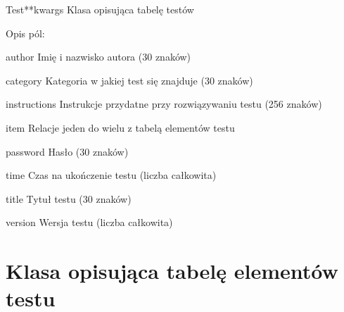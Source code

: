 \documentclass[letterpaper,10pt,polish]{manual}
\begin{document}
\hypertarget{dbmodel.Test}{}\begin{classdesc}{Test}{**kwargs}
Klasa opisująca tabelę testów

Opis pól:

\hypertarget{dbmodel.Test.author}{}\begin{memberdesc}{author}
Imię i nazwisko autora (30 znaków)
\end{memberdesc}

\hypertarget{dbmodel.Test.category}{}\begin{memberdesc}{category}
Kategoria w jakiej test się znajduje (30 znaków)
\end{memberdesc}

\hypertarget{dbmodel.Test.instructions}{}\begin{memberdesc}{instructions}
Instrukcje przydatne przy rozwiązywaniu testu (256 znaków)
\end{memberdesc}

\hypertarget{dbmodel.Test.item}{}\begin{memberdesc}{item}
Relacje jeden do wielu z tabelą elementów testu
\end{memberdesc}

\hypertarget{dbmodel.Test.password}{}\begin{memberdesc}{password}
Hasło (30 znaków)
\end{memberdesc}

\hypertarget{dbmodel.Test.time}{}\begin{memberdesc}{time}
Czas na ukończenie testu (liczba całkowita)
\end{memberdesc}

\hypertarget{dbmodel.Test.title}{}\begin{memberdesc}{title}
Tytuł testu (30 znaków)
\end{memberdesc}

\hypertarget{dbmodel.Test.version}{}\begin{memberdesc}{version}
Wersja testu (liczba całkowita)
\end{memberdesc}
\end{classdesc}
\hypertarget{dbmodel-item}{}

\section{Klasa opisująca tabelę elementów testu}
\end{document}
